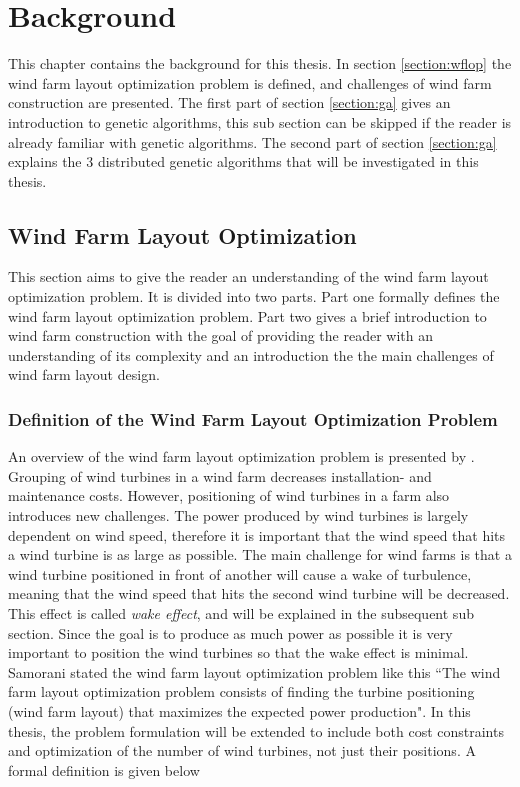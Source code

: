 \chapter{Background}\label{chapter:background}
This chapter contains the background for this thesis. In section \ref{section:wflop} the wind farm layout optimization problem is defined, and challenges of wind farm construction are presented. The first part of section \ref{section:ga} gives an introduction to genetic algorithms, this sub section can be skipped if the reader is already familiar with genetic algorithms. The second part of section \ref{section:ga} explains the 3 distributed genetic algorithms that will be investigated in this thesis.


\section{Wind Farm Layout Optimization}\label{section:wflo}
This section aims to give the reader an understanding of the wind farm layout optimization problem. It is divided into two parts. Part one formally defines the wind farm layout optimization problem. Part two gives a brief introduction to wind farm construction with the goal of providing the reader with an understanding of its complexity and an introduction the the main challenges of wind farm layout design.


\subsection{Definition of the Wind Farm Layout Optimization Problem}
An overview of the wind farm layout optimization problem is presented by \cite{Samorani}. Grouping of wind turbines in a wind farm decreases installation- and maintenance costs. However, positioning of wind turbines in a farm also introduces new challenges. The power produced by wind turbines is largely dependent on wind speed, therefore it is important that the wind speed that hits a wind turbine is as large as possible. The main challenge for wind farms is that a wind turbine positioned in front of another will cause a wake of turbulence, meaning that the wind speed that hits the second wind turbine will be decreased. This effect is called \textit{wake effect}, and will be explained in the subsequent sub section. Since the goal is to produce as much power as possible it is very important to position the wind turbines so that the wake effect is minimal. Samorani stated the wind farm layout optimization problem like this ``The wind farm layout optimization problem consists of finding the turbine positioning (wind farm layout) that maximizes the expected power production". In this thesis, the problem formulation will be extended to include both cost constraints and optimization of the number of wind turbines, not just their positions. A formal definition is given below


